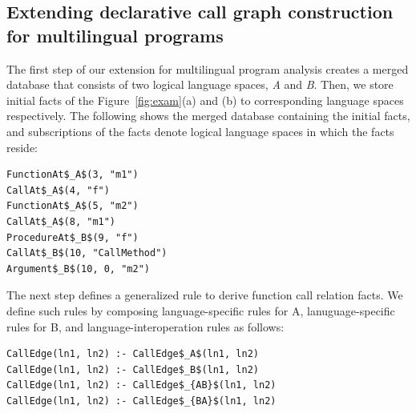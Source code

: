 %


\subsection{Extending declarative call graph construction for multilingual programs}


The first step of our extension for multilingual program analysis creates a
merged database that consists of two logical language spaces, {\it A} and {\it
B}. Then, we store initial facts of the Figure~\ref{fig:exam}(a) and (b) to
corresponding language spaces respectively. The following shows the merged
database containing the initial facts, and subscriptions of the facts denote
logical language spaces in which the facts reside: 

\begin{lstlisting}
FunctionAt$_A$(3, "m1")
CallAt$_A$(4, "f")
FunctionAt$_A$(5, "m2")
CallAt$_A$(8, "m1")
ProcedureAt$_B$(9, "f")
CallAt$_B$(10, "CallMethod")
Argument$_B$(10, 0, "m2")
\end{lstlisting}


The next step defines a generalized rule to derive function call relation
facts. We define such rules by composing language-specific rules for A,
lanuguage-specific rules for B, and language-interoperation rules as follows:

\begin{lstlisting}
CallEdge(ln1, ln2) :- CallEdge$_A$(ln1, ln2)
CallEdge(ln1, ln2) :- CallEdge$_B$(ln1, ln2)
CallEdge(ln1, ln2) :- CallEdge$_{AB}$(ln1, ln2)
CallEdge(ln1, ln2) :- CallEdge$_{BA}$(ln1, ln2)
\end{lstlisting}

